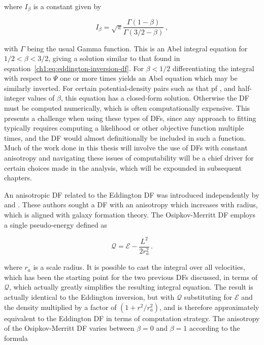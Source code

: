 \noindent where $I_{\beta}$ is a constant given by

\begin{equation}
    I_{\beta} = \sqrt{\pi}\frac{\Gamma(1-\beta)}{\Gamma(3/2-\beta)}\,,
\end{equation}

\noindent with $\Gamma$ being the usual Gamma function. This is an Abel integral equation for $1/2 < \beta < 3/2$, giving a solution similar to that found in equation~\eqref{ch1:eq:eddington-inversion-df}. For $\beta < 1/2$ differentiating the integral with respect to $\Psi$ one or more times yields an Abel equation which may be similarly inverted. For certain potential-density pairs such as that pf \textcite{hernquist90}, and half-integer values of $\beta$, this equation has a closed-form solution. Otherwise the DF must be computed numerically, which is often computationally expensive. This presents a challenge when using these types of DFs, since any approach to fitting typically requires computing a likelihood or other objective function multiple times, and the DF would almost definitionally be included in such a function. Much of the work done in this thesis will involve the use of DFs with constant anisotropy and navigating these issues of computability will be a chief driver for certain choices made in the analysis, which will be expounded in subsequent chapters.

An anisotropic DF related to the Eddington DF was introduced independently by \textcite{osipkov79} and \textcite{merritt85}. These authors sought a DF with an anisotropy which increases with radius, which is aligned with galaxy formation theory. The Osipkov-Merritt DF employs a single pseudo-energy defined as 

\begin{equation}
    \label{ch1:eq:osipkov-merritt-pseudo-energy}
    \mathcal{Q} = \mathcal{E} - \frac{L^{2}}{2r_{a}^{2}}\,.
\end{equation}

\noindent where $r_{a}$ is a scale radius. It is possible to cast the integral over all velocities, which has been the starting point for the two previous DFs discussed, in terms of $\mathcal{Q}$, which actually greatly simplifies the resulting integral equation. The result is actually identical to the Eddington inversion, but with $\mathcal{Q}$ substituting for $\mathcal{E}$ and the density multiplied by a factor of $(1 + r^{2}/r_{a}^{2})$, and is therefore approximately equivalent to the Eddington DF in terms of computation strategy. The anisotropy of the Osipkov-Merritt DF varies between $\beta=0$ and $\beta=1$ according to the formula

